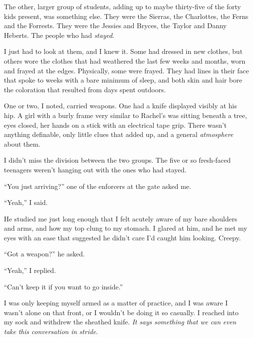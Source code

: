 The other, larger group of students, adding up to maybe thirty-five of the forty kids present, was something else.  They were the Sierras, the Charlottes, the Ferns and the Forrests.  They were the Jessies and Bryces, the Taylor and Danny Heberts.  The people who had \emph{stayed}.



I just had to look at them, and I knew it.  Some had dressed in new clothes, but others wore the clothes that had weathered the last few weeks and months, worn and frayed at the edges.  Physically, some were frayed.  They had lines in their face that spoke to weeks with a bare minimum of sleep, and both skin and hair bore the coloration that resulted from days spent outdoors.



One or two, I noted, carried weapons.  One had a knife displayed visibly at his hip.  A girl with a burly frame very similar to Rachel's was sitting beneath a tree, eyes closed, her hands on a stick with an electrical tape grip.  There wasn't anything definable, only little clues that added up, and a general \emph{atmosphere }about them.



I didn't miss the division between the two groups.  The five or so fresh-faced teenagers weren't hanging out with the ones who had stayed.



``You just arriving?'' one of the enforcers at the gate asked me.



``Yeah,'' I said.



He studied me just long enough that I felt acutely aware of my bare shoulders and arms, and how my top clung to my stomach.  I glared at him, and he met my eyes with an ease that suggested he didn't care I'd caught him looking.  Creepy.



``Got a weapon?''  he asked.



``Yeah,'' I replied.



``Can't keep it if you want to go inside.''



I was only keeping myself armed as a matter of practice, and I was aware I wasn't alone on that front, or I wouldn't be doing it so casually.  I reached into my sock and withdrew the sheathed knife.  \emph{It says something that we can even take this conversation in stride}.




